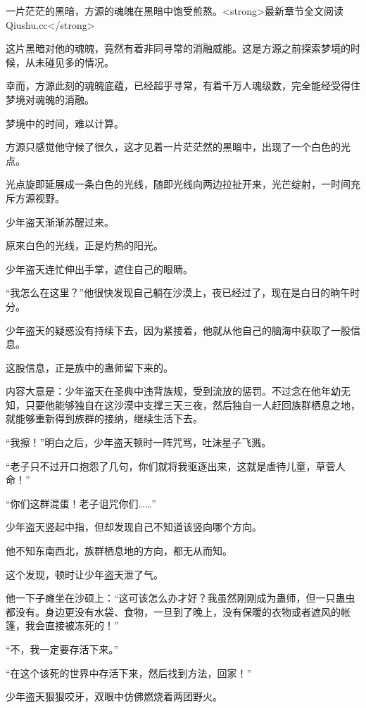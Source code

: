 
\begin{this_body}

一片茫茫的黑暗，方源的魂魄在黑暗中饱受煎熬。<strong>最新章节全文阅读Qiushu.cc</strong>

这片黑暗对他的魂魄，竟然有着非同寻常的消融威能。这是方源之前探索梦境的时候，从未碰见多的情况。

幸而，方源此刻的魂魄底蕴，已经超乎寻常，有着千万人魂级数，完全能经受得住梦境对魂魄的消融。

梦境中的时间，难以计算。

方源只感觉他守候了很久，这才见着一片茫茫然的黑暗中，出现了一个白色的光点。

光点旋即延展成一条白色的光线，随即光线向两边拉扯开来，光芒绽射，一时间充斥方源视野。

少年盗天渐渐苏醒过来。

原来白色的光线，正是灼热的阳光。

少年盗天连忙伸出手掌，遮住自己的眼睛。

“我怎么在这里？”他很快发现自己躺在沙漠上，夜已经过了，现在是白日的晌午时分。

少年盗天的疑惑没有持续下去，因为紧接着，他就从他自己的脑海中获取了一股信息。

这股信息，正是族中的蛊师留下来的。

内容大意是：少年盗天在圣典中违背族规，受到流放的惩罚。不过念在他年幼无知，只要他能够独自在这沙漠中支撑三天三夜，然后独自一人赶回族群栖息之地，就能够重新得到族群的接纳，继续生活下去。

“我擦！”明白之后，少年盗天顿时一阵咒骂，吐沫星子飞溅。

“老子只不过开口抱怨了几句，你们就将我驱逐出来，这就是虐待儿童，草菅人命！”

“你们这群混蛋！老子诅咒你们……”

少年盗天竖起中指，但却发现自己不知道该竖向哪个方向。

他不知东南西北，族群栖息地的方向，都无从而知。

这个发现，顿时让少年盗天泄了气。

他一下子瘫坐在沙硕上：“这可该怎么办才好？我虽然刚刚成为蛊师，但一只蛊虫都没有。身边更没有水袋、食物，一旦到了晚上，没有保暖的衣物或者遮风的帐篷，我会直接被冻死的！”

“不，我一定要存活下来。”

“在这个该死的世界中存活下来，然后找到方法，回家！”

少年盗天狠狠咬牙，双眼中仿佛燃烧着两团野火。


\end{this_body}

